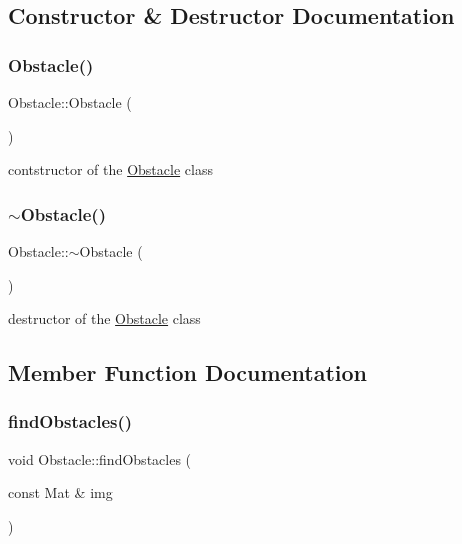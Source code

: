 \subsection{Constructor \& Destructor Documentation}
\mbox{\label{class_obstacle_a8f734072321fa06a7b7dae2d5f50f352}} 
\subsubsection{\texorpdfstring{Obstacle()}{Obstacle()}}
{\footnotesize\ttfamily Obstacle\+::\+Obstacle (\begin{DoxyParamCaption}{ }\end{DoxyParamCaption})}

contstructor of the \mbox{\hyperlink{class_obstacle}{Obstacle}} class \mbox{\label{class_obstacle_af2f9cc9c6cff75dca0974fd5ac4f71a9}} 
\subsubsection{\texorpdfstring{$\sim$\+Obstacle()}{~Obstacle()}}
{\footnotesize\ttfamily Obstacle\+::$\sim$\+Obstacle (\begin{DoxyParamCaption}{ }\end{DoxyParamCaption})}

destructor of the \mbox{\hyperlink{class_obstacle}{Obstacle}} class 

\subsection{Member Function Documentation}
\mbox{\label{class_obstacle_ae333b23b742b38e50be13bc7aec2da5b}} 
\subsubsection{\texorpdfstring{find\+Obstacles()}{findObstacles()}}
{\footnotesize\ttfamily void Obstacle\+::find\+Obstacles (\begin{DoxyParamCaption}\item[{const Mat \&}]{img }\end{DoxyParamCaption})}

